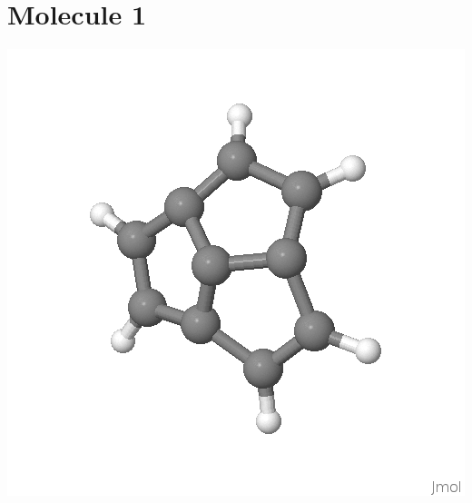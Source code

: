 \documentclass{article}
\begin{document}
\section{Molecule 1}
\includegraphics[scale=0.5]{M10001.png}\\
\end{document}
